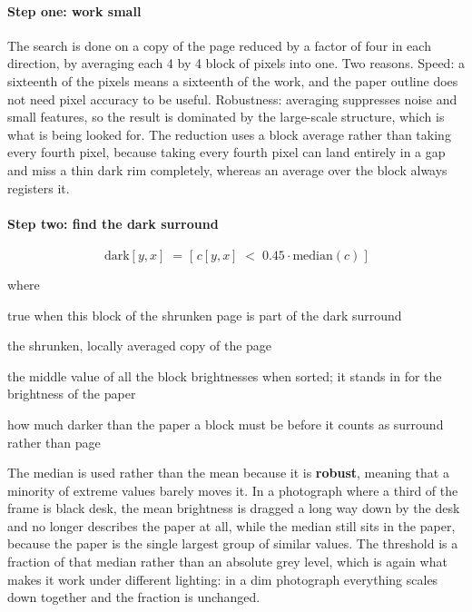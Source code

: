 \paragraph{Step one: work small}
The search is done on a copy of the page reduced by a factor of four in each direction, by averaging each 4 by 4 block of pixels into one. Two reasons. Speed: a sixteenth of the pixels means a sixteenth of the work, and the paper outline does not need pixel accuracy to be useful. Robustness: averaging suppresses noise and small features, so the result is dominated by the large-scale structure, which is what is being looked for. The reduction uses a block average rather than taking every fourth pixel, because taking every fourth pixel can land entirely in a gap and miss a thin dark rim completely, whereas an average over the block always registers it.


\paragraph{Step two: find the dark surround}

\begin{equation}
\mathrm{dark}[y,x] \;=\; \big[\; c[y,x] \;<\; 0.45 \cdot \mathrm{median}(c) \;\big]
\end{equation}

\noindent where
\begin{description}[leftmargin=2.4em,style=nextline,font=\normalfont\ttfamily]\setlength\itemsep{1pt}
  \item[{$\mathrm{dark}[y,x]$}] \normalfont true when this block of the shrunken page is part of the dark surround
  \item[{$c$}] \normalfont the shrunken, locally averaged copy of the page
  \item[{$\mathrm{median}(c)$}] \normalfont the middle value of all the block brightnesses when sorted; it stands in for the brightness of the paper
  \item[{$0.45$}] \normalfont how much darker than the paper a block must be before it counts as surround rather than page
\end{description}
The median is used rather than the mean because it is \textbf{robust}, meaning that a minority of extreme values barely moves it. In a photograph where a third of the frame is black desk, the mean brightness is dragged a long way down by the desk and no longer describes the paper at all, while the median still sits in the paper, because the paper is the single largest group of similar values. The threshold is a fraction of that median rather than an absolute grey level, which is again what makes it work under different lighting: in a dim photograph everything scales down together and the fraction is unchanged.


